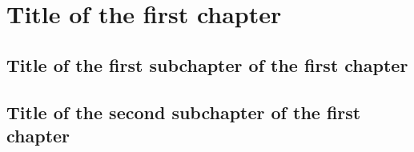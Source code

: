 \chapter{Title of the first chapter}

\section{Title of the first subchapter of the first chapter}

\section{Title of the second subchapter of the first chapter}
